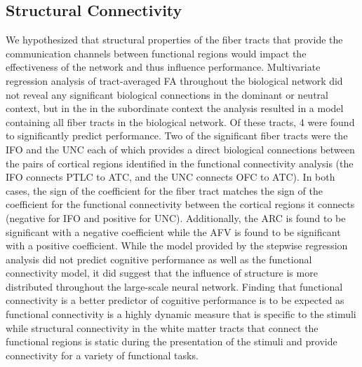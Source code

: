 \subsection{Structural Connectivity}
We hypothesized that structural properties of the fiber tracts that provide the communication channels between functional regions would impact the effectiveness of the network and thus influence performance. Multivariate regression analysis of tract-averaged FA throughout the biological network did not reveal any significant biological connections in the dominant or neutral context, but in the in the subordinate context the analysis resulted in a model containing all fiber tracts in the biological network. Of these tracts, 4 were found to significantly predict performance. Two of the significant fiber tracts were the IFO and the UNC each of which provides a direct biological connections between the pairs of cortical regions identified in the functional connectivity analysis (the IFO connects PTLC to ATC, and the UNC connects OFC to ATC). In both cases, the sign of the coefficient for the fiber tract matches the sign of the coefficient for the functional connectivity between the cortical regions it connects (negative for IFO and positive for UNC). Additionally, the ARC is found to be significant with a negative coefficient while the AFV is found to be significant with a positive coefficient. While the model provided by the stepwise regression analysis did not predict cognitive performance as well as the functional connectivity model, it did suggest that the influence of structure is more distributed throughout the large-scale neural network. Finding that functional connectivity is a better predictor of cognitive performance is to be expected as functional connectivity is a highly dynamic measure that is specific to the stimuli while structural connectivity in the white matter tracts that connect the functional regions is static during the presentation of the stimuli and provide connectivity for a variety of functional tasks.

